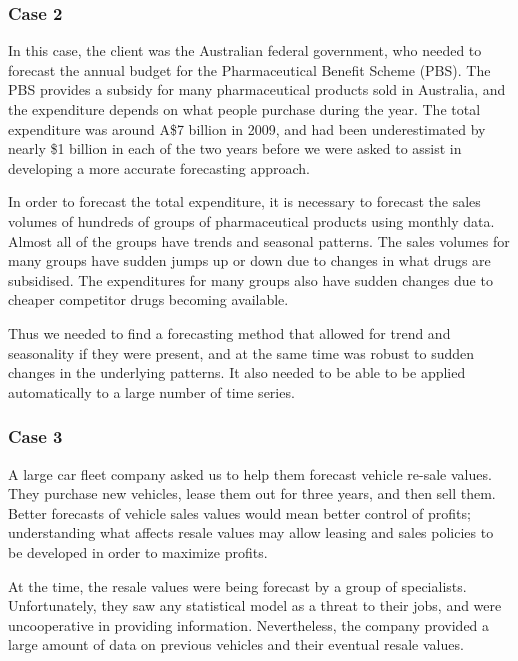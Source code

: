 \documentclass[]{book}
\begin{document}
\hypertarget{case-2}{%
\subsubsection*{Case 2}\label{case-2}}

In this case, the client was the Australian federal government, who needed to forecast the annual budget for the Pharmaceutical Benefit Scheme (PBS). The PBS provides a subsidy for many pharmaceutical products sold in Australia, and the expenditure depends on what people purchase during the year. The total expenditure was around A\$7 billion in 2009, and had been underestimated by nearly \$1 billion in each of the two years before we were asked to assist in developing a more accurate forecasting approach.

In order to forecast the total expenditure, it is necessary to forecast the sales volumes of hundreds of groups of pharmaceutical products using monthly data. Almost all of the groups have trends and seasonal patterns. The sales volumes for many groups have sudden jumps up or down due to changes in what drugs are subsidised. The expenditures for many groups also have sudden changes due to cheaper competitor drugs becoming available.

Thus we needed to find a forecasting method that allowed for trend and seasonality if they were present, and at the same time was robust to sudden changes in the underlying patterns. It also needed to be able to be applied automatically to a large number of time series.

\hypertarget{case-3}{%
\subsubsection*{Case 3}\label{case-3}}

A large car fleet company asked us to help them forecast vehicle re-sale values. They purchase new vehicles, lease them out for three years, and then sell them. Better forecasts of vehicle sales values would mean better control of profits; understanding what affects resale values may allow leasing and sales policies to be developed in order to maximize profits.

At the time, the resale values were being forecast by a group of specialists. Unfortunately, they saw any statistical model as a threat to their jobs, and were uncooperative in providing information. Nevertheless, the company provided a large amount of data on previous vehicles and their eventual resale values.
\end{document}
